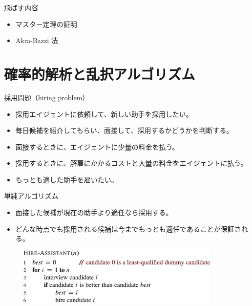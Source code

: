 \documentclass[unicode,11pt,aspectratio=169,notes]{beamer} %
\begin{document}

\begin{frame}{飛ばす内容}
  \begin{itemize}
    \item マスター定理の証明
    \item Akra-Bazzi 法
  \end{itemize}
\end{frame}

\section*{確率的解析と乱択アルゴリズム}

\begin{frame}
  \sectionpage{}
\end{frame}

\begin{frame}{採用問題（hiring problem）}
  \begin{itemize}
    \item 採用エイジェントに依頼して、新しい助手を採用したい。
    \item 毎日候補を紹介してもらい、面接して、採用するかどうかを判断する。
    \item 面接するときに、エイジェントに少量の料金を払う。
    \item 採用するときに、解雇にかかるコストと大量の料金をエイジェントに払う。
    \item もっとも適した助手を雇いたい。
  \end{itemize}
\end{frame}

\begin{frame}{単純アルゴリズム}
  \begin{itemize}
    \item 面接した候補が現在の助手より適任なら採用する。
    \item どんな時点でも採用される候補は今までもっとも適任であることが保証される。
  \end{itemize}
  \begin{figure}
    \includegraphics[width=0.90\textwidth]{../resources/pseudo-05-01}
  \end{figure}
\end{frame}
\end{document}
